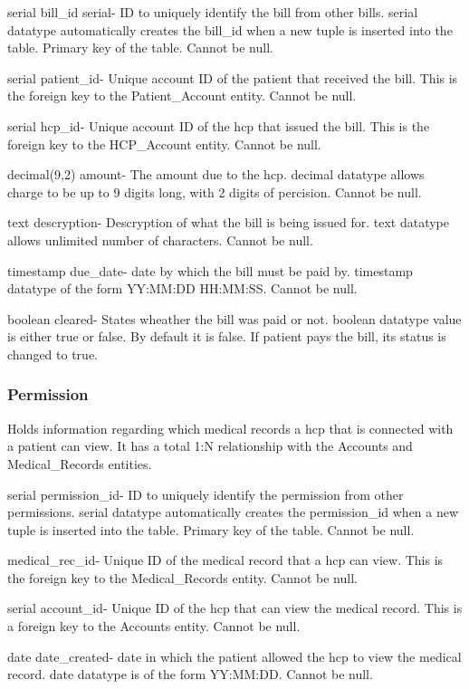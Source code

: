 \documentclass[12pt]{report}
\begin{document}
\begin{description}
\item serial bill\_id serial-  ID to uniquely identify the bill from other bills. serial datatype automatically creates the bill\_id when a new tuple is inserted into the table.  Primary key of the table.  Cannot be null.
\item serial patient\_id- Unique account ID of the patient that received the bill.  This is the foreign key to the Patient\_Account entity.  Cannot be null.
\item serial hcp\_id- Unique account ID of the hcp that issued the bill.  This is the foreign key to the HCP\_Account entity.  Cannot be null.
\item decimal(9,2) amount- The amount due to the hcp.  decimal datatype allows charge to be up to 9 digits long, with 2 digits of percision.  Cannot be null.
\item text descryption- Descryption of what the bill is being issued for.  text datatype allows unlimited number of characters. Cannot be null.
\item timestamp due\_date- date by which the bill must be paid by.  timestamp datatype of the form YY:MM:DD HH:MM:SS.  Cannot be null.
\item boolean cleared- States wheather the bill was paid or not.  boolean datatype value is either true or false.  By default it is false.  If patient pays the bill, its status is changed to true.
\end{description}

\subsubsection{Permission}
Holds information regarding which medical records a hcp that is connected with a patient can view.  It has a total 1:N relationship with the Accounts and Medical\_Records entities.

\begin{description}
\item serial permission\_id-  ID to uniquely identify the permission from other permissions. serial datatype automatically creates the permission\_id when a new tuple is inserted into the table.  Primary key of the table.  Cannot be null.
\item medical\_rec\_id- Unique ID of the medical record that a hcp can view.  This is the foreign key to the Medical\_Records entity.  Cannot be null.
\item serial account\_id- Unique ID of the hcp that can view the medical record.  This is a foreign key to the Accounts entity.  Cannot be null.
\item date date\_created-  date in which the patient allowed the hcp to view the medical record.  date datatype is of the form YY:MM:DD.  Cannot be null.
\end{description}
\end{document}
